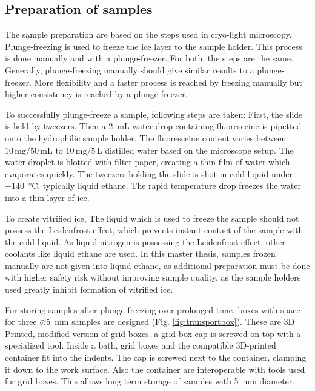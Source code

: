 \subsection{Preparation of samples}
The sample preparation are based on the steps used in cryo-light microscopy. Plunge-freezing is used to freeze the ice layer to the sample holder. This process is done manually and with a plunge-freezer. For both, the steps are the same. Generally, plunge-freezing manually should give similar results to a plunge-freezer. More flexibility and a faster process is reached by freezing manually but higher consistency is reached by a plunge-freezer.

To successfully plunge-freeze a sample, following steps are taken: First, the slide is held by tweezers. Then a \SI{2}{\milli\liter} water drop containing fluoresceine is pipetted onto the hydrophilic sample holder. The fluoresceine content varies between $10\,\si{\milli\gram}/50\,\si{\milli\liter}$ to $10\,\si{\milli\gram}/5\,\si{\liter}$ distilled water based on the microscope setup. The water droplet is blotted with filter paper, creating a thin film of water which evaporates quickly. The tweezers holding the slide is shot in cold liquid under \SI{-140}{\degreeCelsius}, typically liquid ethane. The rapid temperature drop freezes the water into a thin layer of ice.

To create vitrified ice, The liquid which is used to freeze the sample should not possess the Leidenfrost effect, which prevents instant contact of the sample with the cold liquid. As liquid nitrogen is possessing the Leidenfrost effect, other coolants like liquid ethane are used. In this master thesis, samples frozen manually are not given into liquid ethane, as additional preparation must be done with higher safety risk without improving sample quality, as the sample holders used greatly inhibit formation of vitrified ice.

For storing samples after plunge freezing over prolonged time, boxes with space for three $\varnothing$\SI{5}{\milli\meter} samples are designed (Fig. \ref{fig:transportbox}). These are 3D Printed, modified version of grid boxes. a grid box cap is screwed on top with a specialized tool. Inside a bath, grid boxes and the compatible 3D-printed container fit into the indents. The cap is screwed next to the container, clamping it down to the work surface. Also the container are interoperable with tools used for grid boxes. This allows long term storage of samples with \SI{5}{\milli\meter} diameter.

